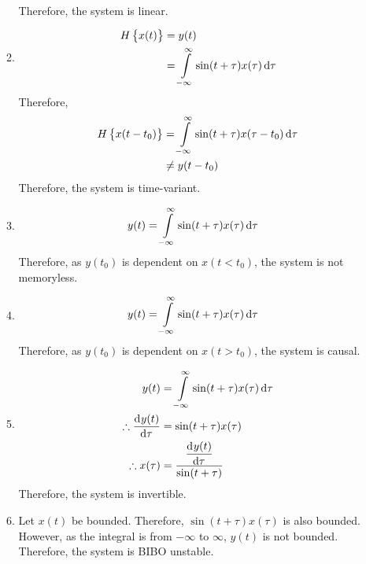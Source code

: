 \documentclass[fleqn, a4paper, 11pt, oneside]{amsart}
\theoremstyle{definition}
\theoremstyle{theorem}
\begin{document}
\begin{solution}
\begin{enumerate}[leftmargin=*]
\begin{enumerate}
\begin{align*}
					\end{align*}
					Therefore, the system is linear.
				\item
					\begin{align*}
						H\left\{ x(t) \right\} & = y(t) \\
                                                                       & = \int\limits_{-\infty}^{\infty} \sin(t + \tau) x(\tau) \dif \tau
					\end{align*}
					Therefore,
					\begin{align*}
						H\left\{ x(t - t_0) \right\} & = \int\limits_{-\infty}^{\infty} \sin(t + \tau) x(\tau - t_0) \dif \tau \\
                                                                             & \neq y(t - t_0)
					\end{align*}
					Therefore, the system is time-variant.
				\item
					\begin{align*}
						y(t) & = \int\limits_{-\infty}^{\infty} \sin(t + \tau) x(\tau) \dif \tau
					\end{align*}
					Therefore, as $y(t_0)$ is dependent on $x(t < t_0)$, the system is not memoryless.
				\item
					\begin{align*}
						y(t) & = \int\limits_{-\infty}^{\infty} \sin(t + \tau) x(\tau) \dif \tau
					\end{align*}
					Therefore, as $y(t_0)$ is dependent on $x(t > t_0)$, the system is causal.
				\item
					\begin{align*}
						y(t)                        & = \int\limits_{-\infty}^{\infty} \sin(t + \tau) x(\tau) \dif \tau \\
						\therefore \dod{y(t)}{\tau} & = \sin(t + \tau) x(\tau)                                          \\
						\therefore x(\tau)          & = \frac{\dod{y(t)}{\tau}}{\sin(t + \tau)}
					\end{align*}
					Therefore, the system is invertible.
				\item
					Let $x(t)$ be bounded.
					Therefore, $\sin(t + \tau) x(\tau)$ is also bounded.
					However, as the integral is from $-\infty$ to $\infty$, $y(t)$ is not bounded.
					Therefore, the system is BIBO unstable.
			\end{enumerate}
	\end{enumerate}
\end{solution}
\end{document}
